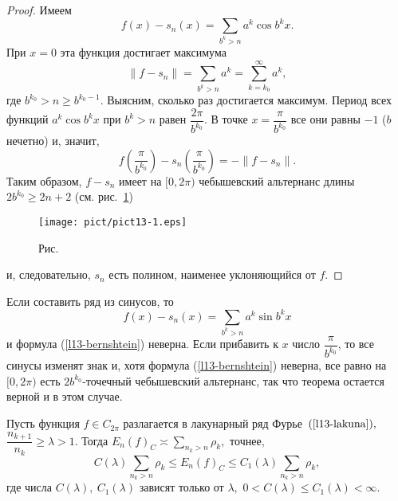 \begin{proof}
Имеем
$$
f(x)-s_n(x)=\sum\limits_{b^k>n} a^k \cos b^k x.
$$
При $x=0$ эта функция достигает максимума
\begin{equation}\label{l13-bernshtein}
\|f-s_n\|=\sum\limits_{b^k>n} a^k=\sum\limits_{k=k_0}^{\infty}a^k,
\end{equation}
где $b^{k_0}>n\ge b^{k_0-1}.$ Выясним, сколько раз достигается максимум.
Период всех функций $a^k\cos b^kx$ при $b^k>n$ равен
$\dfrac{2\pi}{b^{k_0}}$. В точке $x=\dfrac{\pi}{b^{k_0}}$ все они равны $-1$
{($b$ нечетно)} и, значит,
$$
f\left(\frac{\pi}{b^{k_0}}\right) - s_n\left(\frac{\pi}{b^{k_0}}\right)=-\|f-s_n\|.
$$
Таким образом, $f-s_n$ имеет на $[0,2\pi)$ чебышевский альтернанс длины $2b^{k_0}\ge 2n+2$
{(см. рис.~\ref{r13-1}})

 \bigskip
\begin{figure}[ht]
\begin{center}
\texttt{[image: pict/pict13-1.eps]}
\end{center}
 \bigskip
 \label{r13-1}

 \centerline{Рис.~\theris}
 \bigskip
\end{figure}

и, следовательно, $s_n$ есть полином, наименее уклоняющийся от $f$.
\end{proof}

\begin{Remark}
Если составить ряд из синусов, то
$$
f(x)-s_n(x)=\sum\limits_{b^k>n} a^k \sin b^k x
$$
и формула (\ref{l13-bernshtein}) неверна. Если прибавить к $x$ число
$\dfrac{\pi}{b^{k_0}}$, то все синусы изменят знак и, хотя формула
(\ref{l13-bernshtein}) неверна, все равно на $[0,2\pi)$ есть
$2b^{k_0}$-точечный чебышевский
альтернанс, так что теорема остается верной и в этом случае.
\end{Remark}

\begin{teo}[С.\,Б.\,Стечкин]
Пусть функция {$f\in C_{2\pi}$} разлагается в лакунарный ряд Фурье~{$(\ref{l13-lakuna}),$}
$\dfrac{n_{k+1}}{n_k}\ge \lambda>1.$ Тогда
$E_n(f)_C\asymp \sum\limits_{n_k>n}\rho_k,$ точнее,
$$
C(\lambda)\sum\limits_{n_k>n}\rho_k \le E_n(f)_C\le {C_1(\lambda)}
\sum\limits_{n_k>n}\rho_k,
$$
где числа $C(\lambda),\ C_1(\lambda)$ зависят только от $\lambda,$ $0<C(\lambda)\le
C_1(\lambda)<\infty$.
\end{teo}

